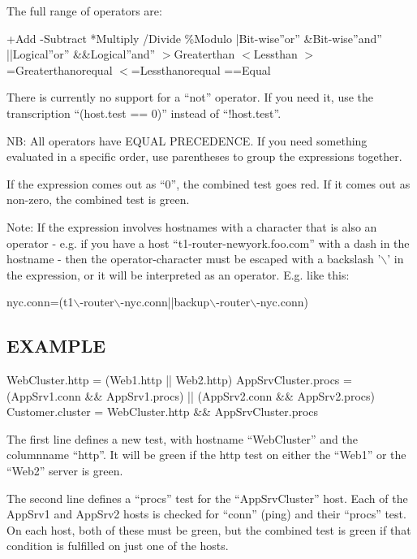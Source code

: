   The full range of operators are: 


  
+Add  
-Subtract  
*Multiply  
/Divide  
\%Modulo  
|Bit-wise''or''  
\&Bit-wise''and''  
||Logical''or''  
\&\&Logical''and''  
$>$Greaterthan  
$<$Lessthan  
$>$=Greaterthanorequal  
$<$=Lessthanorequal  
==Equal 


  There is currently no support for a ``not'' operator. If you need
  it, use the transcription ``(host.test == 0)'' instead of
  ``!host.test''. 



  NB: All operators have EQUAL PRECEDENCE. If you need something evaluated in a specific order, use parentheses to group the expressions together. 


  If the expression comes out as ``0'', the combined test goes red. If it comes out as non-zero, the combined test is green. 


  Note: If the expression involves hostnames with a character that is
  also an operator - e.g. if you have a host
  ``t1-router-newyork.foo.com'' with a dash in the hostname - then the
  operator-character must be escaped with a backslash '$\backslash$'
  in the expression, or it will be interpreted as an
  operator. E.g. like this: 



  
nyc.conn=(t1$\backslash$-router$\backslash$-nyc.conn||backup$\backslash$-router$\backslash$-nyc.conn) 


 


 
\subsection{EXAMPLE}
 WebCluster.http = (Web1.http || Web2.http)  
 AppSrvCluster.procs = (AppSrv1.conn \&\& AppSrv1.procs) || (AppSrv2.conn \&\& AppSrv2.procs)  
 Customer.cluster = WebCluster.http \&\& AppSrvCluster.procs  


  The first line defines a new test, with hostname ``WebCluster'' and
  the columnname ``http''. It will be green if the http test on either
  the ``Web1'' or the ``Web2'' server is green. 



  The second line defines a ``procs'' test for the ``AppSrvCluster''
  host. Each of the AppSrv1 and AppSrv2 hosts is checked for ``conn''
  (ping) and their ``procs'' test. On each host, both of these must be
  green, but the combined test is green if that condition is fulfilled
  on just one of the hosts. 



